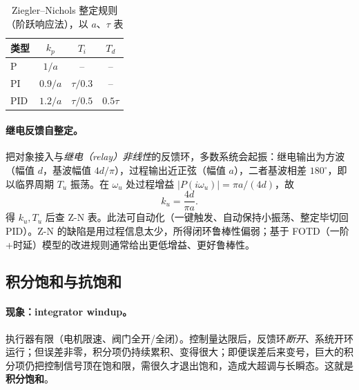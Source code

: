 \begin{table}[H]\centering\small
\caption{Ziegler--Nichols 整定规则（阶跃响应法），以 $a$、$\tau$ 表}
\label{tab:ctrl-zn-step}
\begin{tabular}{lccc}
\toprule
类型 & $k_p$ & $T_i$ & $T_d$ \\
\midrule
P   & $1/a$   & --          & --        \\
PI  & $0.9/a$ & $\tau/0.3$  & --        \\
PID & $1.2/a$ & $\tau/0.5$  & $0.5\tau$ \\
\bottomrule
\end{tabular}
\end{table}


\paragraph{继电反馈自整定。}
把对象接入与\emph{继电（relay）非线性}的反馈环，多数系统会起振：继电输出为方波（幅值 $d$，基波幅值 $4d/\pi$），过程输出近正弦（幅值 $a$），二者基波相差 $180^\circ$，即以临界周期 $T_u$ 振荡\cite{astrom2008feedback}。在 $\omega_u$ 处过程增益 $|P(i\omega_u)|=\pi a/(4d)$，故
\begin{equation}
  k_u=\frac{4d}{\pi a}.
  \label{eq:ctrl-relay}
\end{equation}
得 $k_u,T_u$ 后查 Z-N 表。此法可自动化（一键触发、自动保持小振荡、整定毕切回 PID）。Z-N 的缺陷是用过程信息太少，所得闭环鲁棒性偏弱；基于 FOTD（一阶+时延）模型的改进规则通常给出更低增益、更好鲁棒性\cite{astrom2008feedback}。

\subsection{积分饱和与抗饱和}
\label{sec:ctrl-pid-windup}

\paragraph{现象：integrator windup。}
执行器有限（电机限速、阀门全开/全闭）。控制量达限后，反馈环\emph{断开}、系统开环运行；但误差非零，积分项仍持续累积、变得很大；即便误差后来变号，巨大的积分项仍把控制信号顶在饱和限，需很久才退出饱和，造成大超调与长瞬态。这就是\textbf{积分饱和}\cite{astrom2008feedback}。

